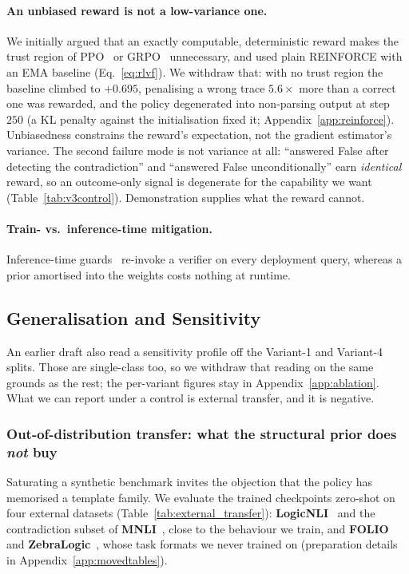 \documentclass{article}
\begin{document}
\paragraph{An unbiased reward is not a low-variance one.} We initially argued
that an exactly computable, deterministic reward makes the trust region of
PPO~\citep{schulman2017proximal} or GRPO~\citep{shao2024deepseekmath}
unnecessary, and used plain REINFORCE with an EMA baseline
(Eq.~\ref{eq:rlvf}). We withdraw that: with no trust region the baseline
climbed to $+0.695$, penalising a wrong trace $5.6\times$ more than a correct
one was rewarded, and the policy degenerated into non-parsing output at
step~$250$ (a KL penalty against the initialisation fixed it;
Appendix~\ref{app:reinforce}). Unbiasedness constrains the reward's
expectation, not the gradient estimator's variance. The second failure mode is
not variance at all: ``answered False after detecting the contradiction'' and
``answered False unconditionally'' earn \emph{identical} reward, so an
outcome-only signal is degenerate for the capability we want
(Table~\ref{tab:v3control}). Demonstration supplies what the reward cannot.

\paragraph{Train- vs.\ inference-time mitigation.} Inference-time guards~\citep{vericot2026,xiong2025deliberate,premiseRAG2025} re-invoke a verifier on every deployment query, whereas a prior amortised into the weights costs nothing at runtime.

\subsection{Generalisation and Sensitivity}
An earlier draft also read a sensitivity profile off the Variant-1 and
Variant-4 splits. Those are single-class too, so we withdraw that reading on
the same grounds as the rest; the per-variant figures stay in
Appendix~\ref{app:ablation}. What we can report under a control is external
transfer, and it is negative.

\subsubsection{Out-of-distribution transfer: what the structural prior does \emph{not} buy}
\label{sec:external}
Saturating a synthetic benchmark invites the objection that the policy has memorised a template family. We evaluate the trained checkpoints zero-shot on four external datasets (Table~\ref{tab:external_transfer}): \textbf{LogicNLI}~\citep{tian-etal-2021-diagnosing} and the contradiction subset of \textbf{MNLI}~\citep{N18-1101}, close to the behaviour we train, and \textbf{FOLIO}~\citep{han2024folio} and \textbf{ZebraLogic}~\citep{lin2025zebralogic}, whose task formats we never trained on (preparation details in Appendix~\ref{app:movedtables}).
\end{document}

